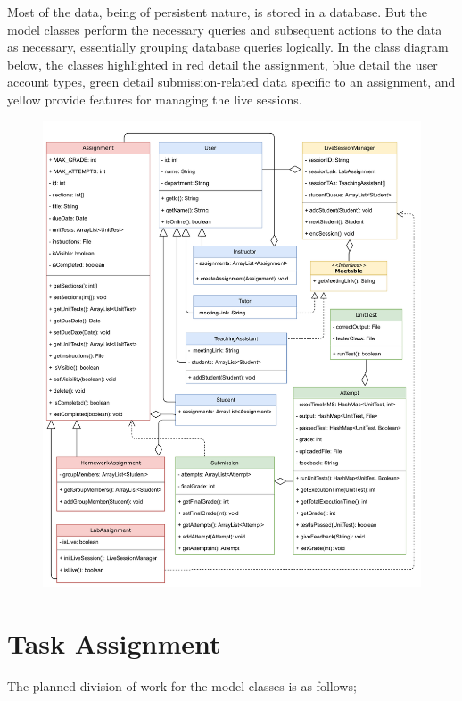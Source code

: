 \documentclass[a4paper, 12pt]{article}
\begin{document}
    Most of the data, being of persistent nature, is stored in a database. But the model classes
    perform the necessary queries and subsequent actions to the data as necessary,
    essentially grouping database queries logically.
    In the class diagram below, the classes highlighted in red detail the assignment, blue detail the user account types,
    green detail submission-related data specific to an assignment, and yellow provide features
    for managing the live sessions.

    \begin{figure}[H]
        \centering
        \includegraphics[width=\textwidth]{class-diagram}
    \end{figure}

    
    \section{Task Assignment}
    
    The planned division of work for the model classes is as follows;
    
\end{document}
